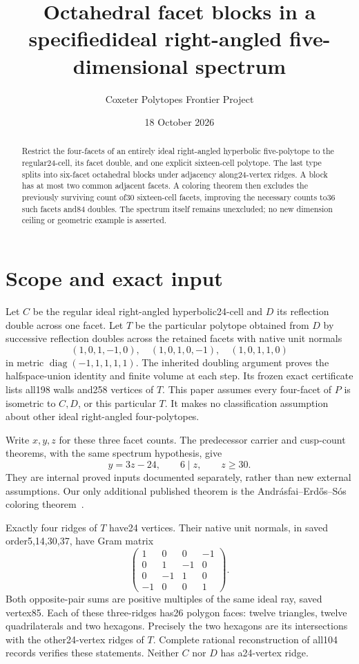 \documentclass[11pt]{article}
\title{Octahedral facet blocks in a specified\linebreak ideal right-angled five-dimensional spectrum}
\author{Coxeter Polytopes Frontier Project}
\date{18 October 2026}
\begin{document}
\maketitle
\begin{abstract}
Restrict the four-facets of an entirely ideal right-angled hyperbolic
five-polytope to the regular24-cell, its facet double, and one explicit
sixteen-cell polytope. The last type splits into six-facet octahedral
blocks under adjacency along24-vertex ridges. A block has at most two
common adjacent facets. A coloring theorem then excludes the previously
surviving count of30 sixteen-cell facets, improving the necessary counts
to36 such facets and84 doubles. The spectrum itself remains unexcluded;
no new dimension ceiling or geometric example is asserted.
\end{abstract}

\section{Scope and exact input}
Let $C$ be the regular ideal right-angled hyperbolic24-cell and $D$ its
reflection double across one facet. Let $T$ be the particular polytope
obtained from $D$ by successive reflection doubles across the retained
facets with native unit normals
\[
 (1,0,1,-1,0),\quad(1,0,1,0,-1),\quad(1,0,1,1,0)
\]
in metric $\operatorname{diag}(-1,1,1,1,1)$. The inherited doubling
argument proves the halfspace-union identity and finite volume at each
step. Its frozen exact certificate lists all198 walls and258 vertices
of $T$. This paper assumes every four-facet of $P$ is isometric to
$C,D$, or this particular $T$. It makes no classification assumption
about other ideal right-angled four-polytopes.

Write $x,y,z$ for these three facet counts. The predecessor carrier and
cusp-count theorems, with the same spectrum hypothesis, give
\begin{equation}\label{eq:counts}
 y=3z-24,\qquad 6\mid z,\qquad z\ge30.
\end{equation}
They are internal proved inputs documented separately, rather than new
external assumptions. Our only additional published theorem is the
Andr\'asfai--Erd\H{o}s--S\'os coloring theorem~\cite{AES}.

Exactly four ridges of $T$ have24 vertices. Their native unit normals,
in saved order5,14,30,37, have Gram matrix
\begin{equation}\label{eq:gram}
 \begin{pmatrix}1&0&0&-1\\0&1&-1&0\\0&-1&1&0\\-1&0&0&1\end{pmatrix}.
\end{equation}
Both opposite-pair sums are positive multiples of the same ideal ray,
saved vertex85. Each of these three-ridges has26 polygon faces:
twelve triangles, twelve quadrilaterals and two hexagons. Precisely
the two hexagons are its intersections with the other24-vertex ridges
of $T$. Complete rational reconstruction of all104 records verifies
these statements. Neither $C$ nor $D$ has a24-vertex ridge.
\end{document}
